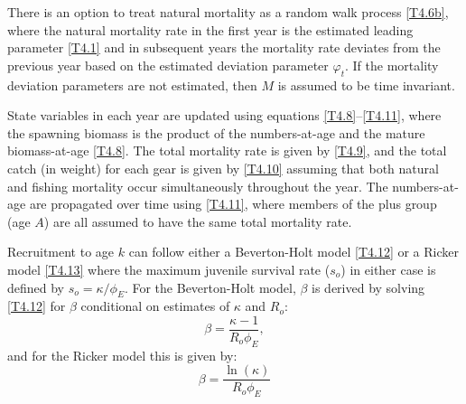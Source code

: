 There is an option to treat natural mortality as a random walk process \eqref{T4.6b}, where the natural mortality rate in the first year is the estimated leading parameter \eqref{T4.1} and in subsequent years the mortality rate deviates from the previous year based on the estimated deviation parameter $\varphi_t$.  If the mortality deviation parameters are not estimated, then $M$ is assumed to be time invariant.

State variables in each year are updated using equations \ref{T4.8}--\ref{T4.11}, where the spawning biomass is the product of the numbers-at-age and the mature biomass-at-age \eqref{T4.8}.  The total mortality rate is given by \eqref{T4.9}, and the total catch (in weight) for each gear is given by \eqref{T4.10} assuming that both natural and fishing mortality occur simultaneously throughout the year.  The numbers-at-age are propagated over time using \eqref{T4.11}, where members of the plus group (age $A$) are all assumed to have the same total mortality rate.  

Recruitment to age $k$ can follow either a Beverton-Holt model \eqref{T4.12} or a Ricker model \eqref{T4.13} where the maximum juvenile survival rate ($s_o$) in either case is defined by $s_o=\kappa/\phi_E$.  For the Beverton-Holt model, $\beta$ is derived by solving \eqref{T4.12} for $\beta$ conditional on estimates of $\kappa$ and $R_o$:
\[
\beta = \frac{\kappa-1}{R_o \phi_E},
\]
and for the Ricker model this is given by:
\[
\beta = \frac{\ln(\kappa)}{R_o \phi_E}
\]






